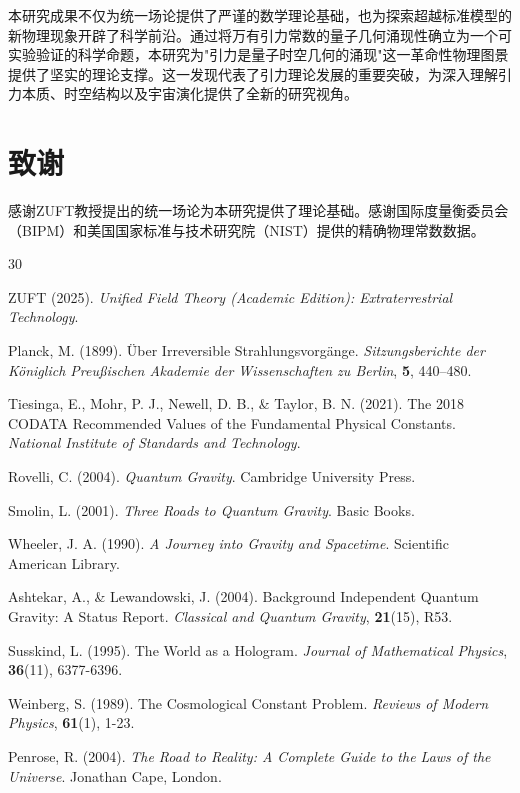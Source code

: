 \documentclass[12pt,twocolumn]{article}
\begin{document}
本研究成果不仅为统一场论提供了严谨的数学理论基础，也为探索超越标准模型的新物理现象开辟了科学前沿。通过将万有引力常数的量子几何涌现性确立为一个可实验验证的科学命题，本研究为"引力是量子时空几何的涌现"这一革命性物理图景提供了坚实的理论支撑。这一发现代表了引力理论发展的重要突破，为深入理解引力本质、时空结构以及宇宙演化提供了全新的研究视角。

\section{致谢}

感谢ZUFT教授提出的统一场论为本研究提供了理论基础。感谢国际度量衡委员会（BIPM）和美国国家标准与技术研究院（NIST）提供的精确物理常数数据。

\begin{thebibliography}{30}

ZUFT (2025). \emph{Unified Field Theory (Academic Edition): Extraterrestrial Technology}.

Planck, M. (1899). Über Irreversible Strahlungsvorgänge. \emph{Sitzungsberichte der Königlich Preußischen Akademie der Wissenschaften zu Berlin}, \textbf{5}, 440–480.

Tiesinga, E., Mohr, P. J., Newell, D. B., & Taylor, B. N. (2021). The 2018 CODATA Recommended Values of the Fundamental Physical Constants. \emph{National Institute of Standards and Technology}.

Rovelli, C. (2004). \emph{Quantum Gravity}. Cambridge University Press.

Smolin, L. (2001). \emph{Three Roads to Quantum Gravity}. Basic Books.

Wheeler, J. A. (1990). \emph{A Journey into Gravity and Spacetime}. Scientific American Library.

Ashtekar, A., & Lewandowski, J. (2004). Background Independent Quantum Gravity: A Status Report. \emph{Classical and Quantum Gravity}, \textbf{21}(15), R53.

Susskind, L. (1995). The World as a Hologram. \emph{Journal of Mathematical Physics}, \textbf{36}(11), 6377-6396.

Weinberg, S. (1989). The Cosmological Constant Problem. \emph{Reviews of Modern Physics}, \textbf{61}(1), 1-23.

Penrose, R. (2004). \emph{The Road to Reality: A Complete Guide to the Laws of the Universe}. Jonathan Cape, London.


\end{thebibliography}
\end{document}
